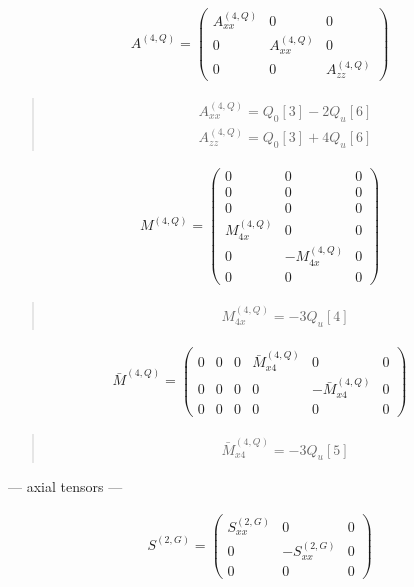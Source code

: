 \documentclass[fleqn,10pt]{jsarticle}
\begin{document}
\begin{align*}
A^{(4,Q)} = \begin{pmatrix} A^{(4,Q)}_{xx} & 0 & 0 \\ 0 & A^{(4,Q)}_{xx} & 0 \\ 0 & 0 & A^{(4,Q)}_{zz} \end{pmatrix}
\end{align*}
\begin{quote}
\begin{align*}
& A^{(4,Q)}_{xx} = Q_{0}[3] - 2 Q_{u}[6] \\
& A^{(4,Q)}_{zz} = Q_{0}[3] + 4 Q_{u}[6]
\end{align*}
\end{quote}
\begin{align*}
M^{(4,Q)} = \begin{pmatrix} 0 & 0 & 0 \\ 0 & 0 & 0 \\ 0 & 0 & 0 \\ M^{(4,Q)}_{4x} & 0 & 0 \\ 0 & - M^{(4,Q)}_{4x} & 0 \\ 0 & 0 & 0 \end{pmatrix}
\end{align*}
\begin{quote}
\begin{align*}
& M^{(4,Q)}_{4x} = - 3 Q_{u}[4]
\end{align*}
\end{quote}
\begin{align*}
\bar{M}^{(4,Q)} = \begin{pmatrix} 0 & 0 & 0 & \bar{M}^{(4,Q)}_{x4} & 0 & 0 \\ 0 & 0 & 0 & 0 & - \bar{M}^{(4,Q)}_{x4} & 0 \\ 0 & 0 & 0 & 0 & 0 & 0 \end{pmatrix}
\end{align*}
\begin{quote}
\begin{align*}
& \bar{M}^{(4,Q)}_{x4} = - 3 Q_{u}[5]
\end{align*}
\end{quote}
\newpage
\begin{center}\LARGE --- axial tensors ---\end{center}
\begin{align*}
S^{(2,G)} = \begin{pmatrix} S^{(2,G)}_{xx} & 0 & 0 \\ 0 & - S^{(2,G)}_{xx} & 0 \\ 0 & 0 & 0 \end{pmatrix}
\end{align*}
\end{document}
